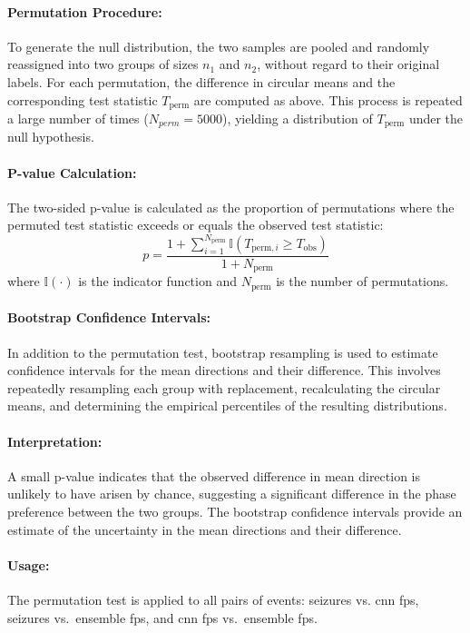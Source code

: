 \paragraph{Permutation Procedure:}
To generate the null distribution, the two samples are pooled and randomly reassigned into two groups of sizes $n_1$ and $n_2$, without regard to their original labels.
For each permutation, the difference in circular means and the corresponding test statistic $T_{\text{perm}}$ are computed as above.
This process is repeated a large number of times ($N_{perm}=5000$), yielding a distribution of $T_{\text{perm}}$ under the null hypothesis.

\paragraph{P-value Calculation:}
The two-sided p-value is calculated as the proportion of permutations where the permuted test statistic exceeds or equals the observed test statistic:
\begin{equation} \label{eq:circ-pval}
    p = \frac{1 + \sum_{i=1}^{N_{\text{perm}}} \mathbb{I}(T_{\text{perm},i} \geq T_{\text{obs}})}{1 + N_{\text{perm}}}
\end{equation}
where $\mathbb{I}(\cdot)$ is the indicator function and $N_{\text{perm}}$ is the number of permutations.

\paragraph{Bootstrap Confidence Intervals:}
In addition to the permutation test, bootstrap resampling is used to estimate confidence intervals for the mean directions and their difference.
This involves repeatedly resampling each group with replacement, recalculating the circular means, and determining the empirical percentiles of the resulting distributions.

\paragraph{Interpretation:}
A small p-value indicates that the observed difference in mean direction is unlikely to have arisen by chance, suggesting a significant difference in the phase preference between the two groups.
The bootstrap confidence intervals provide an estimate of the uncertainty in the mean directions and their difference.

\paragraph{Usage:} The permutation test is applied to all pairs of events: seizures vs. \gls{cnn} \glspl{fp}, seizures vs.\ ensemble \glspl{fp}, and \gls{cnn} \glspl{fp} vs.\ ensemble \glspl{fp}.

